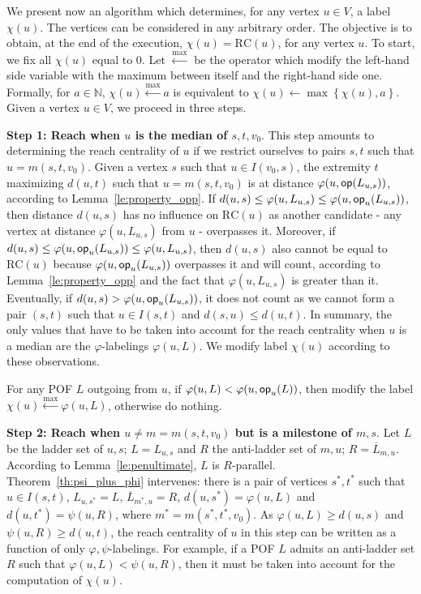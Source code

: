 \documentclass{article}
\newcommand{\set}[1]{\left\{ #1 \right\}}
\newcommand{\opp}{\mbox{\textsf{op}}}
\newcommand{\rc}{\mbox{RC}}
\begin{document}
We present now an algorithm which determines, for any vertex $u \in V$, a label $\chi(u)$. The vertices can be considered in any arbitrary order. The objective is to obtain, at the end of the execution, $\chi(u) = \rc(u)$, for any vertex $u$. To start, we fix all $\chi(u)$ equal to 0. Let $\xleftarrow{\max}$ be the operator which modify the left-hand side variable with the maximum between itself and the right-hand side one. Formally, for $a \in \mathbb{N}$, $\chi(u) \xleftarrow{\max} a$ is equivalent to $\chi(u) \leftarrow \max \set{\chi(u),a}$. Given a vertex $u \in V$, we proceed in three steps.

\textbf{Step 1: Reach when $u$ is the median of $s,t,v_0$}. This step amounts to determining the reach centrality of $u$ if we restrict ourselves to pairs $s,t$ such that $u = m(s,t,v_0)$. Given a vertex $s$ such that $u \in I(v_0,s)$, the extremity $t$ maximizing $d(u,t)$ such that $u = m(s,t,v_0)$ is at distance $\varphi(u,\opp(L_{u,s}))$, according to Lemma~\ref{le:property_opp}. If $d(u,s) \le \varphi(u,L_{u,s}) \le \varphi(u,\opp_u(L_{u,s}))$, then distance $d(u,s)$ has no influence on $\rc(u)$ as another candidate - any vertex at distance $\varphi(u,L_{u,s})$ from $u$ - overpasses it. Moreover, if $d(u,s) \le \varphi(u,\opp_u(L_{u,s})) \le \varphi(u,L_{u,s})$, then $d(u,s)$ also cannot be equal to $\rc(u)$ because $\varphi(u,\opp_u(L_{u,s}))$ overpasses it and will count, according to Lemma~\ref{le:property_opp} and the fact that $\varphi(u,L_{u,s})$ is greater than it. Eventually, if $d(u,s) > \varphi(u,\opp_u(L_{u,s}))$, it does not count as we cannot form a pair $(s,t)$ such that $u\in I(s,t)$ and $d(s,u) \le d(u,t)$. In summary, the only values that have to be taken into account for the reach centrality when $u$ is a median are the $\varphi$-labelings $\varphi(u,L)$. We modify label $\chi(u)$ according to these observations.

For any POF $L$ outgoing from $u$, if $\varphi(u,L) < \varphi(u,\opp_u(L))$, then modify the label $\chi(u) \xleftarrow{\max} \varphi(u,L)$, otherwise do nothing.

\textbf{Step 2: Reach when $u\neq m=m(s,t,v_0)$ but is a milestone of $m,s$}. Let $L$ be the ladder set of $u,s$; $L = L_{u,s}$ and $R$ the anti-ladder set of $m,u$; $R = \overline{L}_{m,u}$. According to Lemma~\ref{le:penultimate}, $L$ is $R$-parallel. Theorem~\ref{th:psi_plus_phi} intervenes: there is a pair of vertices $s^*,t^*$ such that $u \in I(s,t)$, $L_{u,s^*} = L$, $\overline{L}_{m^*,u} = R$, $d(u,s^*) = \varphi(u,L)$ and $d(u,t^*) = \psi(u,R)$, where $m^* = m(s^*,t^*,v_0)$. As $\varphi(u,L) \ge d(u,s)$ and $\psi(u,R) \ge d(u,t)$, the  reach centrality of $u$ in this step can be written as a function of only  $\varphi,\psi$-labelings. For example, if a POF $L$ admits an anti-ladder set $R$ such that $\varphi(u,L) < \psi(u,R)$, then it must be taken into account for the computation of $\chi(u)$.
\end{document}
